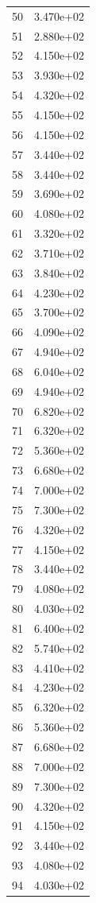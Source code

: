 \documentclass[12pt]{article}
\begin{document}
\begin{longtable}{@{}cc@{}}
50 & 3.470e+02 \\
51 & 2.880e+02 \\
52 & 4.150e+02 \\
53 & 3.930e+02 \\
54 & 4.320e+02 \\
55 & 4.150e+02 \\
56 & 4.150e+02 \\
57 & 3.440e+02 \\
58 & 3.440e+02 \\
59 & 3.690e+02 \\
60 & 4.080e+02 \\
61 & 3.320e+02 \\
62 & 3.710e+02 \\
63 & 3.840e+02 \\
64 & 4.230e+02 \\
65 & 3.700e+02 \\
66 & 4.090e+02 \\
67 & 4.940e+02 \\
68 & 6.040e+02 \\
69 & 4.940e+02 \\
70 & 6.820e+02 \\
71 & 6.320e+02 \\
72 & 5.360e+02 \\
73 & 6.680e+02 \\
74 & 7.000e+02 \\
75 & 7.300e+02 \\
76 & 4.320e+02 \\
77 & 4.150e+02 \\
78 & 3.440e+02 \\
79 & 4.080e+02 \\
80 & 4.030e+02 \\
81 & 6.400e+02 \\
82 & 5.740e+02 \\
83 & 4.410e+02 \\
84 & 4.230e+02 \\
85 & 6.320e+02 \\
86 & 5.360e+02 \\
87 & 6.680e+02 \\
88 & 7.000e+02 \\
89 & 7.300e+02 \\
90 & 4.320e+02 \\
91 & 4.150e+02 \\
92 & 3.440e+02 \\
93 & 4.080e+02 \\
94 & 4.030e+02 \\

\end{longtable}
\end{document}
